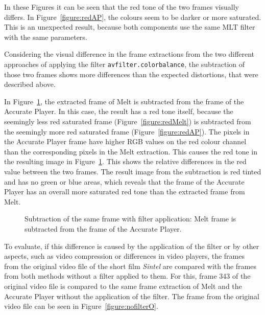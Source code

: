 \documentclass[../MasterThesis.tex]{subfiles}
\begin{document}
\vspace*{1.5em}
In these Figures it can be seen that the red tone of the two frames visually differs. In Figure~\ref{figure:redAP}, the colours seem to be darker or more saturated. This is an unexpected result, because both components use the same MLT filter with the same parameters.


Considering the visual difference in the frame extractions from the two different approaches of applying the filter \texttt{avfilter.colorbalance}, the subtraction of those two frames shows more differences than the expected distortions, that were described above.

In Figure~\ref{figure:filterVSfilter}, the extracted frame of Melt is subtracted from the frame of the Accurate Player.
In this case, the result has a red tone itself, because the seemingly less red saturated frame (Figure~\ref{figure:redMelt}) is subtracted from the seemingly more red saturated frame (Figure~\ref{figure:redAP}). The pixels in the Accurate Player frame have higher RGB values on the red colour channel than the corresponding pixels in the Melt extraction. This causes the red tone in the resulting image in Figure~\ref{figure:filterVSfilter}.
This shows the relative differences in the red value between the two frames. 
The result image from the subtraction is red tinted and has no green or blue areas, which reveals that the frame of the Accurate Player has an overall more saturated red tone than the extracted frame from Melt.


\begin{figure}[H]
	\begin{center}
		\caption[Subtraction of the two different frames (Accurate Player - Melt).]{Subtraction of the same frame with filter application:  Melt frame is subtracted from the frame of the Accurate Player.}
		\label{figure:filterVSfilter}
	\end{center}
\end{figure}

To evaluate, if this difference is caused by the application of the filter or by other aspects, such as video compression or differences in video players, the frames from the original video file of the short film \textit{Sintel} are compared with the frames from both methods without a filter applied to them. For this, frame 343 of the original video file is compared to the same frame extraction of Melt and the Accurate Player without the application of the filter. The frame from the original video file can be seen in Figure~\ref{figure:nofilterO}.
\end{document}

